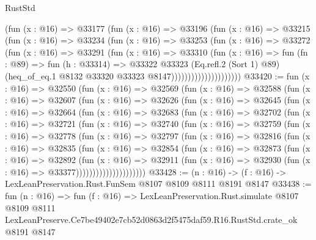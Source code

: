 \begin{lexlean}{RustStd}
\begin{coremodule}
                          (fun (x : @16) =>
                          @33177
                            (fun (x : @16) =>
                            @33196
                              (fun (x : @16) =>
                              @33215
                                (fun (x : @16) =>
                                @33234
                                  (fun (x : @16) =>
                                  @33253
                                    (fun (x : @16) =>
                                    @33272
                                      (fun (x : @16) =>
                                      @33291
                                        (fun (x : @16) =>
                                        @33310
                                          (fun (x : @16) =>
                                          fun (fn : @89) =>
                                          fun (h : @33314) =>
                                          @33322
                                            @33323
                                            (Eq.refl.{2} (Sort 1) @89)
                                            (heq_of_eq.{1}
                                              @8132
                                              @33320
                                              @33323
                                              @8147)))))))))))))))))))))
@33420 := fun (x : @16) =>
  @32550
    (fun (x : @16) =>
    @32569
      (fun (x : @16) =>
      @32588
        (fun (x : @16) =>
        @32607
          (fun (x : @16) =>
          @32626
            (fun (x : @16) =>
            @32645
              (fun (x : @16) =>
              @32664
                (fun (x : @16) =>
                @32683
                  (fun (x : @16) =>
                  @32702
                    (fun (x : @16) =>
                    @32721
                      (fun (x : @16) =>
                      @32740
                        (fun (x : @16) =>
                        @32759
                          (fun (x : @16) =>
                          @32778
                            (fun (x : @16) =>
                            @32797
                              (fun (x : @16) =>
                              @32816
                                (fun (x : @16) =>
                                @32835
                                  (fun (x : @16) =>
                                  @32854
                                    (fun (x : @16) =>
                                    @32873
                                      (fun (x : @16) =>
                                      @32892
                                        (fun (x : @16) =>
                                        @32911
                                          (fun (x : @16) =>
                                          @32930 (fun (x : @16) => @33377)))))))))))))))))))))
@33428 := (n : @16) -> (f : @16) -> LexLeanPreservation.Rust.FunSem @8107 @8109 @8111 @8191 @8147
@33438 := fun (n : @16) =>
  fun (f : @16) =>
  LexLeanPreservation.Rust.simulate
    @8107
    @8109
    @8111
    LexLeanPreserve.Ce7be49402e7cb52d0863d2f5475daf59.R16.RustStd.crate_ok
    @8191
    @8147
\end{coremodule}
\end{lexlean}
